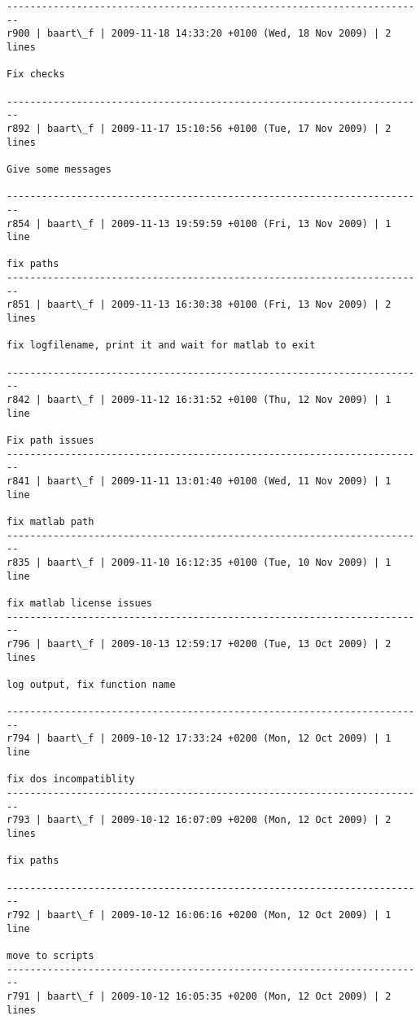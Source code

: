 \documentclass[9]{report}
\begin{document}
\begin{description}
\begin{verbatim}
------------------------------------------------------------------------
r900 | baart\_f | 2009-11-18 14:33:20 +0100 (Wed, 18 Nov 2009) | 2 lines

Fix checks

------------------------------------------------------------------------
r892 | baart\_f | 2009-11-17 15:10:56 +0100 (Tue, 17 Nov 2009) | 2 lines

Give some messages

------------------------------------------------------------------------
r854 | baart\_f | 2009-11-13 19:59:59 +0100 (Fri, 13 Nov 2009) | 1 line

fix paths
------------------------------------------------------------------------
r851 | baart\_f | 2009-11-13 16:30:38 +0100 (Fri, 13 Nov 2009) | 2 lines

fix logfilename, print it and wait for matlab to exit

------------------------------------------------------------------------
r842 | baart\_f | 2009-11-12 16:31:52 +0100 (Thu, 12 Nov 2009) | 1 line

Fix path issues
------------------------------------------------------------------------
r841 | baart\_f | 2009-11-11 13:01:40 +0100 (Wed, 11 Nov 2009) | 1 line

fix matlab path
------------------------------------------------------------------------
r835 | baart\_f | 2009-11-10 16:12:35 +0100 (Tue, 10 Nov 2009) | 1 line

fix matlab license issues
------------------------------------------------------------------------
r796 | baart\_f | 2009-10-13 12:59:17 +0200 (Tue, 13 Oct 2009) | 2 lines

log output, fix function name

------------------------------------------------------------------------
r794 | baart\_f | 2009-10-12 17:33:24 +0200 (Mon, 12 Oct 2009) | 1 line

fix dos incompatiblity
------------------------------------------------------------------------
r793 | baart\_f | 2009-10-12 16:07:09 +0200 (Mon, 12 Oct 2009) | 2 lines

fix paths

------------------------------------------------------------------------
r792 | baart\_f | 2009-10-12 16:06:16 +0200 (Mon, 12 Oct 2009) | 1 line

move to scripts
------------------------------------------------------------------------
r791 | baart\_f | 2009-10-12 16:05:35 +0200 (Mon, 12 Oct 2009) | 2 lines


\end{verbatim}
\end{description}
\end{document}
